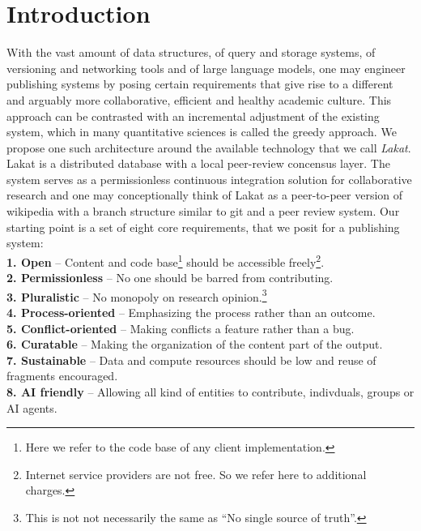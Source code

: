 
\section{Introduction}
\label{sc:introduction}

With the vast amount of data structures, of query and storage systems, of versioning and networking tools and of large language models, one may engineer publishing systems by posing certain requirements that give rise to a different and arguably more collaborative, efficient and healthy academic culture. This approach can be contrasted with an incremental adjustment of the existing system, which in many quantitative sciences is called the greedy approach. We propose one such architecture around the available technology that we call \textit{Lakat}.
Lakat is a distributed database with a local peer-review concensus layer. The system serves as a permissionless continuous integration solution for collaborative research and one may conceptionally think of Lakat as a peer-to-peer  version of wikipedia with a branch structure similar to git and a peer review system.
Our starting point is a set of eight core requirements, that we posit for a publishing system:\\

\indent \textbf{1. Open} -- 
 Content and code base\footnote{Here we refer to the code base of any client implementation.} should be accessible freely\footnote{Internet service providers are not free. So we refer here to additional charges.}.\\
\indent\textbf{2. Permissionless} --
 No one should be barred from contributing.\\
\indent\textbf{3. Pluralistic} -- No monopoly on research opinion.\footnote{This is not not necessarily the same as ``No single source of truth''.}\\
\indent\textbf{4. Process-oriented} -- Emphasizing the process rather than an outcome.\\
\indent\textbf{5. Conflict-oriented} -- Making conflicts a feature rather than a bug.\\
\indent\textbf{6. Curatable} -- Making the organization of the content part of the output.\\
\indent\textbf{7. Sustainable} -- 
 Data and compute resources should be low and reuse of fragments encouraged.\\
\indent\textbf{8. AI friendly} -- Allowing all kind of entities to contribute, indivduals, groups or AI agents.\\

